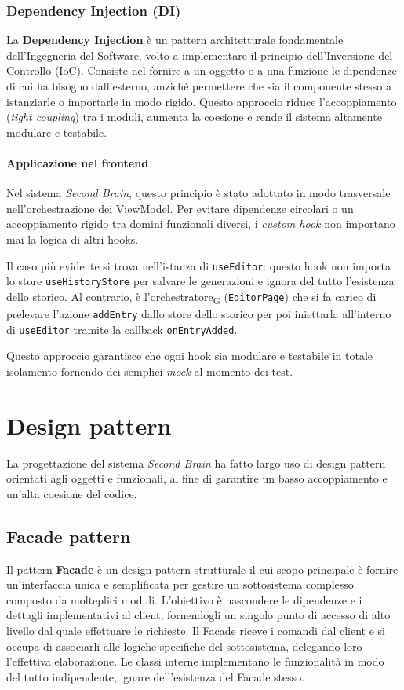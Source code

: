 \documentclass[11pt,a4paper]{article}
\newcommand{\gls}[1]{#1\textsubscript{G}}
\begin{document}
\subsubsection{Dependency Injection (DI)}
La \textbf{Dependency Injection} è un pattern architetturale fondamentale dell'Ingegneria del Software, volto a implementare il principio dell'Inversione del Controllo (IoC). Consiste nel fornire a un oggetto o a una funzione le dipendenze di cui ha bisogno dall'esterno, anziché permettere che sia il componente stesso a istanziarle o importarle in modo rigido. Questo approccio riduce l'accoppiamento (\textit{tight coupling}) tra i moduli, aumenta la coesione e rende il sistema altamente modulare e testabile.

\paragraph{Applicazione nel frontend}
Nel sistema \textit{Second Brain}, questo principio è stato adottato in modo trasversale nell'orchestrazione dei ViewModel. Per evitare dipendenze circolari o un accoppiamento rigido tra domini funzionali diversi, i \textit{custom hook} non importano mai la logica di altri hooks.

Il caso più evidente si trova nell'istanza di \texttt{useEditor}: questo hook non importa lo store \texttt{useHistoryStore} per salvare le generazioni e ignora del tutto l'esistenza dello storico. Al contrario, è l'\gls{orchestratore} (\texttt{EditorPage}) che si fa carico di prelevare l'azione \texttt{addEntry} dallo store dello storico per poi iniettarla all'interno di \texttt{useEditor} tramite la callback \texttt{onEntryAdded}.

Questo approccio garantisce che ogni hook sia modulare e testabile in totale isolamento fornendo dei semplici \textit{mock} al momento dei test.


\newpage

\section{Design pattern}
La progettazione del sistema \textit{Second Brain} ha fatto largo uso di design pattern orientati agli oggetti e funzionali, al fine di garantire un basso accoppiamento e un'alta coesione del codice.

\subsection{Facade pattern}
Il pattern \textbf{Facade} è un design pattern strutturale il cui scopo principale è fornire un'interfaccia unica e semplificata per gestire un sottosistema complesso composto da molteplici moduli.
L'obiettivo è nascondere le dipendenze e i dettagli implementativi al client, fornendogli un singolo punto di accesso di alto livello dal quale effettuare le richieste. Il Facade riceve i comandi dal client e si occupa di associarli alle logiche specifiche del sottosistema, delegando loro l'effettiva elaborazione. Le classi interne implementano le funzionalità in modo del tutto indipendente, ignare dell'esistenza del Facade stesso.
\end{document}

